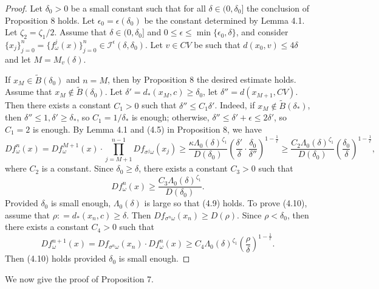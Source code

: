 \documentclass[11pt,oneside]{article}
\theoremstyle{plain}
\numberwithin{equation}{section}
\numberwithin{figure}{section}
\numberwithin{table}{section}
\begin{document}
\begin{proof}

Let $\delta_0 > 0$ be a small constant such that for all $\delta \in (0, \delta_0]$ the conclusion of Proposition 8 holds. Let $\epsilon_0 = \epsilon(\delta_0)$ be the constant determined by Lemma 4.1. Let $\zeta_2 = \zeta_1 /2$. Assume that $\delta \in (0, \delta_0]$ and $0 \leq \epsilon \leq \min \{ \epsilon_0, \delta\}$, and consider $\{x_j \}_{j=0}^n = \{ f_{\omega}^j(x) \}_{j=0}^n \in \mathcal I^{\epsilon}(\delta, \delta_0)$. Let $v \in CV$ be such that $d(x_0, v)\leq 4 \delta$ and let $M = M_v(\delta)$. 


If $x_M \in \tilde B(\delta_0)$ and $n =M$,  then by Proposition 8 the desired estimate holds. Assume that $x_M \notin \tilde B(\delta_0)$. Let $\delta' = d_*(x_M, c) \geq \delta_0$, let $\delta''= d(x_{M+1}, CV)$. Then there exists a constant $C_1 >0$ such that $\delta'' \leq C_1 \delta'$. Indeed, if $x_M \notin \tilde B(\delta_*)$, then $\delta'' \leq 1, \delta' \geq \delta_*$, so $C_1 = 1/ \delta_*$ is enough; otherwise, $\delta'' \leq \delta' + \epsilon \leq 2 \delta'$, so $C_1 = 2$ is enough. By Lemma 4.1 and (4.5) in Proposition 8, we have
\[
Df_{\omega}^n(x) = Df_{\omega}^{M+1}(x) \cdot \prod_{j=M+1}^{n-1} Df_{\sigma^j \omega} (x_j)  \geq  \frac{\kappa \Lambda_0(\delta)^{\zeta_1}}{D(\delta_0)}  \left( \frac{\delta'}{\delta} \cdot \frac{\delta_0}{\delta''} \right)^{1 - \frac{1}{\ell}} \geq \frac{C_2 \Lambda_0(\delta)^{\zeta_1}}{D(\delta_0)}\left( \frac{\delta_0}{\delta} \right)^{1 - \frac{1}{\ell}}, 
\]
where $C_2$ is a constant. Since $\delta_0 \geq \delta$, there exists a constant $C_3 > 0$ such that 
\[
Df_{\omega}^n(x)  \geq \frac{C_3 \Lambda_0(\delta)^{\zeta_1}}{D(\delta_0)}.
\]
Provided $\delta_0$ is small enough, $\Lambda_0(\delta)$ is large so that (4.9) holds. To prove (4.10), assume that $\rho : = d_*(x_n, c) \geq \delta$. Then $Df_{\sigma^n \omega}(x_n) \geq D(\rho)$. Since $\rho < \delta_0$, then there exists a constant $C_4>0$ such that 
\[
D f_{\omega}^{n+1} (x) = Df_{\sigma^n \omega}(x_n) \cdot D f_{\omega}^{n} (x) \geq C_4 \Lambda_0(\delta)^{\zeta_1} \left( \frac{\rho}{\delta} \right)^{1 - \frac{1}{\ell}}.
\]
Then (4.10) holds provided $\delta_0$ is small enough.

\end{proof}


We now give the proof of Proposition 7.
\end{document}
